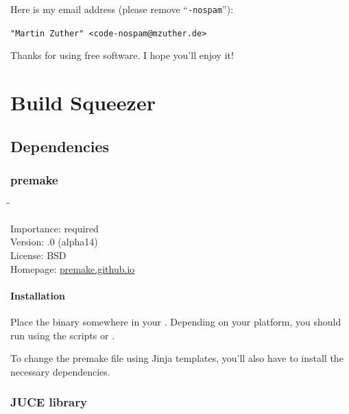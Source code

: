\newpage %

Here is my email address (please remove ``\texttt{-nospam}''):

\begin{center}
  \texttt{"Martin Zuther" <code-nospam@mzuther.de>}
\end{center}

Thanks for using free software.  I hope you'll enjoy it!

\appendix

\chapter{Build Squeezer}
\label{chap:build_squeezer}

\section{Dependencies}
\label{sec:dependencies}

\subsection{premake}
\label{sec:dependencies_premake}

\begin{tabbing}
  \hspace*{6em}\=\=\kill

  Importance:  \> required \\
  Version:     .0 (alpha14) \\
  License:     \> BSD \\
  Homepage:    \> \href{https://premake.github.io/}{premake.github.io}
\end{tabbing}

\subsubsection{Installation}

Place the binary somewhere in your .  Depending on your
platform, you should run  using the scripts
 or .

To change the premake file using Jinja templates, you'll also have to
install the necessary dependencies.

\subsection{JUCE library}

